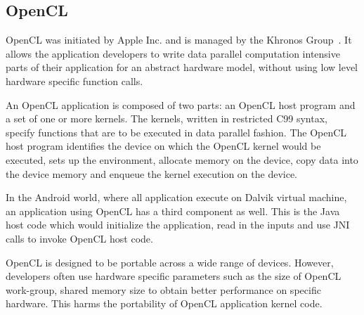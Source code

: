 
\subsection{OpenCL}
OpenCL was initiated by Apple Inc. and is managed by the Khronos
Group~\cite{Khronos:url}. It allows the application developers to write
data parallel computation intensive parts of their application for an abstract
hardware model, without using low level hardware specific function calls.

An OpenCL application is composed of two parts: an OpenCL host program and a
set of one or more kernels. The kernels, written in restricted C99 syntax,
specify functions that are to be executed in data parallel fashion. The OpenCL
host program identifies the device on which the OpenCL kernel would be
executed, sets up the environment, allocate memory on the device, copy data
into the device memory and enqueue the kernel execution on the device.

In the Android world, where all application execute on Dalvik virtual machine,
an application using OpenCL has a third component as well. This is the Java
host code which would initialize the application, read in the inputs and use
JNI calls to invoke OpenCL host code.

OpenCL is designed to be portable across a wide range of devices. However,
developers often use hardware specific parameters such as the size of OpenCL
work-group, shared memory size to obtain better performance on specific
hardware. This harms the portability of OpenCL application kernel code.

